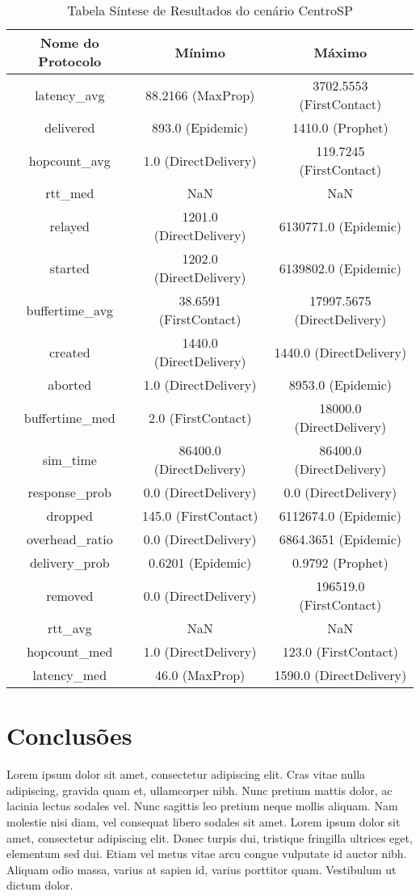 \documentclass[conference]{IEEEtran}
\begin{document}
\begin{table}[!t]
\caption{Tabela Síntese de Resultados do cenário CentroSP}
\label{table:centrosp}
\centering
\begin{tabular}{|c|c c|}
  \hline
  Nome do Protocolo & Mínimo & Máximo \\
  \hline
  latency\_avg & 88.2166 (MaxProp) & 3702.5553 (FirstContact) \\
  delivered & 893.0 (Epidemic) & 1410.0 (Prophet) \\
  hopcount\_avg & 1.0 (DirectDelivery) & 119.7245 (FirstContact) \\
  rtt\_med & NaN & NaN \\
  relayed & 1201.0 (DirectDelivery) & 6130771.0 (Epidemic) \\
  started & 1202.0 (DirectDelivery) & 6139802.0 (Epidemic) \\
  buffertime\_avg & 38.6591 (FirstContact) & 17997.5675 (DirectDelivery) \\
  created & 1440.0 (DirectDelivery) & 1440.0 (DirectDelivery) \\
  aborted & 1.0 (DirectDelivery) & 8953.0 (Epidemic) \\
  buffertime\_med & 2.0 (FirstContact) & 18000.0 (DirectDelivery) \\
  sim\_time & 86400.0 (DirectDelivery) & 86400.0 (DirectDelivery) \\
  response\_prob & 0.0 (DirectDelivery) & 0.0 (DirectDelivery) \\
  dropped & 145.0 (FirstContact) & 6112674.0 (Epidemic) \\
  overhead\_ratio & 0.0 (DirectDelivery) & 6864.3651 (Epidemic) \\
  delivery\_prob & 0.6201 (Epidemic) & 0.9792 (Prophet) \\
  removed & 0.0 (DirectDelivery) & 196519.0 (FirstContact) \\
  rtt\_avg & NaN & NaN \\
  hopcount\_med & 1.0 (DirectDelivery) & 123.0 (FirstContact) \\
  latency\_med & 46.0 (MaxProp) & 1590.0 (DirectDelivery) \\
  \hline
\end{tabular}
\end{table}

\section{Conclusões}
Lorem ipsum dolor sit amet, consectetur adipiscing elit. Cras vitae nulla adipiscing, gravida quam et, ullamcorper nibh. Nunc pretium mattis dolor, ac lacinia lectus sodales vel. Nunc sagittis leo pretium neque mollis aliquam. Nam molestie nisi diam, vel consequat libero sodales sit amet. Lorem ipsum dolor sit amet, consectetur adipiscing elit. Donec turpis dui, tristique fringilla ultrices eget, elementum sed dui. Etiam vel metus vitae arcu congue vulputate id auctor nibh. Aliquam odio massa, varius at sapien id, varius porttitor quam. Vestibulum ut dictum dolor.
\end{document}
